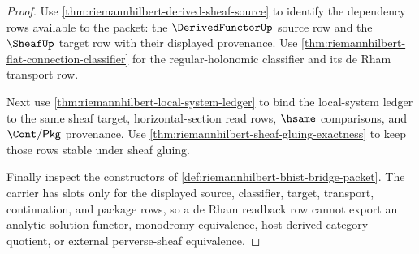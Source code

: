\begin{proof}
Use \autoref{thm:riemannhilbert-derived-sheaf-source} to identify the dependency rows available to the packet: the $\DerivedFunctorUp$ source row and the $\SheafUp$ target row with their displayed provenance. Use \autoref{thm:riemannhilbert-flat-connection-classifier} for the regular-holonomic classifier and its de Rham transport row.

Next use \autoref{thm:riemannhilbert-local-system-ledger} to bind the local-system ledger to the same sheaf target, horizontal-section read rows, $\hsame$ comparisons, and $\Cont/\mathsf{Pkg}$ provenance. Use \autoref{thm:riemannhilbert-sheaf-gluing-exactness} to keep those rows stable under sheaf gluing.

Finally inspect the constructors of \autoref{def:riemannhilbert-bhist-bridge-packet}. The carrier has slots only for the displayed source, classifier, target, transport, continuation, and package rows, so a de Rham readback row cannot export an analytic solution functor, monodromy equivalence, host derived-category quotient, or external perverse-sheaf equivalence.
\end{proof}

